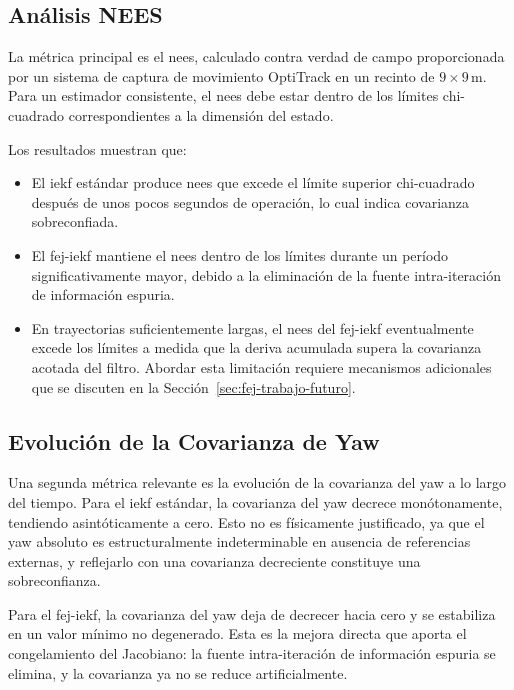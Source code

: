 \subsection{Análisis NEES}
\label{sec:fej-nees}

La métrica principal es el \gls{nees}, calculado contra verdad de campo
proporcionada por un sistema de captura de movimiento OptiTrack en un recinto
de $9 \times 9\,\mathrm{m}$. Para un estimador consistente, el \gls{nees} debe
estar dentro de los límites chi-cuadrado correspondientes a la dimensión del
estado.

Los resultados muestran que:

\begin{itemize}
    \item El \gls{iekf} estándar produce \gls{nees} que excede el límite
    superior chi-cuadrado después de unos pocos segundos de operación, lo
    cual indica covarianza sobreconfiada.
    \item El \gls{fej}-\gls{iekf} mantiene el \gls{nees} dentro de los límites
    durante un período significativamente mayor, debido a la eliminación de
    la fuente intra-iteración de información espuria.
    \item En trayectorias suficientemente largas, el \gls{nees} del
    \gls{fej}-\gls{iekf} eventualmente excede los límites a medida que la
    deriva acumulada supera la covarianza acotada del filtro. Abordar esta
    limitación requiere mecanismos adicionales que se discuten en la
    Sección~\ref{sec:fej-trabajo-futuro}.
\end{itemize}

\subsection{Evolución de la Covarianza de Yaw}
\label{sec:fej-yaw-cov}

Una segunda métrica relevante es la evolución de la covarianza del yaw a lo
largo del tiempo. Para el \gls{iekf} estándar, la covarianza del yaw decrece
monótonamente, tendiendo asintóticamente a cero. Esto no es físicamente
justificado, ya que el yaw absoluto es estructuralmente indeterminable en
ausencia de referencias externas, y reflejarlo con una covarianza decreciente
constituye una sobreconfianza.

Para el \gls{fej}-\gls{iekf}, la covarianza del yaw deja de decrecer hacia
cero y se estabiliza en un valor mínimo no degenerado. Esta es la mejora
directa que aporta el congelamiento del Jacobiano: la fuente intra-iteración
de información espuria se elimina, y la covarianza ya no se reduce
artificialmente.

